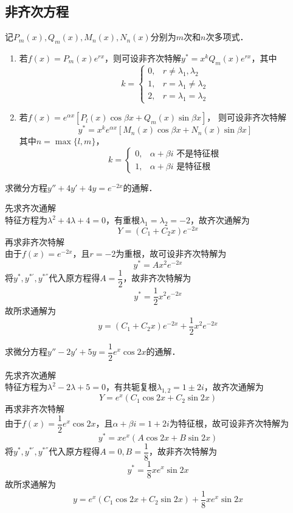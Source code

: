 \documentclass[12pt, a4paper, oneside, UTF8]{ctexbook}
\begin{document}
\subsection{非齐次方程}
\begin{theorem}[待定系数法]
    记$P_m(x),Q_m(x),M_n(x),N_n(x)$分别为$m$次和$n$次多项式．
    \begin{enumerate}
        \item 若$f(x)=P_m(x)e^{rx}$，则可设非齐次特解$y^*=x^k Q_m(x)e^{r x}$，其中
        \[
        k = \begin{cases}
            0, & r \neq \lambda_1, \lambda_2 \\
            1, & r = \lambda_1 \neq \lambda_2 \\
            2, & r = \lambda_1 = \lambda_2
        \end{cases}
        \]
        \item 若$f(x)=e^{\alpha x}\left[P_l(x)\cos \beta x + Q_m(x)\sin \beta x\right]$，
        则可设非齐次特解
        \[y^*=x^k e^{\alpha x}\left[M_n(x)\cos \beta x + N_n(x)\sin \beta x\right]\]
        其中$n=\max{\{l,m\}}$，
        \[
        k = \begin{cases}
            0, & \alpha + \beta i \text{ 不是特征根} \\
            1, & \alpha + \beta i \text{ 是特征根}
        \end{cases}
        \]
    \end{enumerate}
\end{theorem}
\begin{example}
    求微分方程$y''+4y'+4y=e^{-2x}$的通解．
\end{example}
\begin{solution}
    \textcolor{infoBlue}{先求齐次通解}\\
    特征方程为$\lambda^2+4\lambda+4=0$，有重根$\lambda_1=\lambda_2=-2$，故齐次通解为
    \[Y=(C_1+C_2 x)e^{-2x}\]
    \textcolor{infoBlue}{再求非齐次特解}\\
    由于$f(x)=e^{-2x}$，且$r=-2$为重根，故可设非齐次特解为
    \[y^*=A x^2 e^{-2x}\]
    将$y^*,y^{*'},y^{*''}$代入原方程得$A=\dfrac{1}{2}$，故非齐次特解为
    \[y^*=\dfrac{1}{2}x^2 e^{-2x}\]
    故所求通解为
    \[\boxed{y=(C_1+C_2 x)e^{-2x}+\dfrac{1}{2}x^2 e^{-2x}}\]
\end{solution}
\begin{example}
    求微分方程$y''-2y'+5y=\dfrac{1}{2}e^{x}\cos 2x$的通解．
\end{example}
\begin{solution}
    \textcolor{infoBlue}{先求齐次通解}\\
    特征方程为$\lambda^2-2\lambda+5=0$，有共轭复根$\lambda_{1,2}=1\pm 2i$，故齐次通解为
    \[Y=e^{x}(C_1 \cos 2x + C_2 \sin 2x)\]
    \textcolor{infoBlue}{再求非齐次特解}\\
    由于$f(x)=\dfrac{1}{2}e^{x}\cos 2x$，且$\alpha + \beta i = 1 + 2i$为特征根，故可设非齐次特解为
    \[y^*=xe^{x}(A \cos 2x + B \sin 2x)\]
    将$y^*,y^{*'},y^{*''}$代入原方程得$A=0,B=\dfrac{1}{8}$，故非齐次特解为
    \[y^*=\dfrac{1}{8}xe^{x} \sin 2x\]
    故所求通解为
    \[\boxed{y=e^{x}(C_1 \cos 2x + C_2 \sin 2x)+\dfrac{1}{8}xe^{x} \sin 2x}\]
\end{solution}
\end{document}
